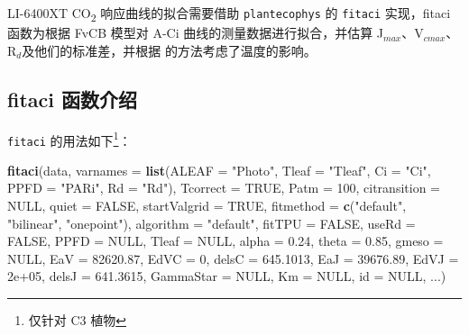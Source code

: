 \documentclass[
]{krantz}
\makeatletter
\newenvironment{Shaded}{\begin{snugshade}}{\end{snugshade}}
\newcommand{\DataTypeTok}[1]{\textcolor[rgb]{0.13,0.29,0.53}{#1}}
\newcommand{\DecValTok}[1]{\textcolor[rgb]{0.00,0.00,0.81}{#1}}
\newcommand{\FloatTok}[1]{\textcolor[rgb]{0.00,0.00,0.81}{#1}}
\newcommand{\KeywordTok}[1]{\textcolor[rgb]{0.13,0.29,0.53}{\textbf{#1}}}
\newcommand{\NormalTok}[1]{#1}
\newcommand{\OtherTok}[1]{\textcolor[rgb]{0.56,0.35,0.01}{#1}}
\newcommand{\StringTok}[1]{\textcolor[rgb]{0.31,0.60,0.02}{#1}}
\newenvironment{kframe}{%
\medskip{}
\setlength{\fboxsep}{.8em}
 \def\at@end@of@kframe{}%
 \ifinner\ifhmode%
  \def\at@end@of@kframe{\end{minipage}}%
  \begin{minipage}{\columnwidth}%
 \fi\fi%
 \def\FrameCommand##1{\hskip\@totalleftmargin \hskip-\fboxsep
 \colorbox{shadecolor}{##1}\hskip-\fboxsep
     \hskip-\linewidth \hskip-\@totalleftmargin \hskip\columnwidth}%
 \MakeFramed {\advance\hsize-\width
   \@totalleftmargin\z@ \linewidth\hsize
   \@setminipage}}%
 {\par\unskip\endMakeFramed%
 \at@end@of@kframe}
\renewenvironment{Shaded}{\begin{kframe}}{\end{kframe}}
\makeatother
\begin{document}
LI-6400XT CO\textsubscript{2} 响应曲线的拟合需要借助 \texttt{plantecophys} 的 \texttt{fitaci} 实现，fitaci 函数为根据 FvCB 模型对 A-Ci 曲线的测量数据进行拟合，并估算 J\(_{max}\)、V\(_{cmax}\)、R\(_{d}\)及他们的标准差，并根据
\citet{Medlyn2002Temperature} 的方法考虑了温度的影响。

\hypertarget{fitaci_intro}{%
\subsection{fitaci 函数介绍}\label{fitaci_intro}}

\texttt{fitaci} 的用法如下\footnote{仅针对 C3 植物}：

\begin{Shaded}
\begin{Highlighting}[]
\KeywordTok{fitaci}\NormalTok{(data, }\DataTypeTok{varnames =} \KeywordTok{list}\NormalTok{(}\DataTypeTok{ALEAF =} \StringTok{"Photo"}\NormalTok{, }
  \DataTypeTok{Tleaf =} \StringTok{"Tleaf"}\NormalTok{, }\DataTypeTok{Ci =} \StringTok{"Ci"}\NormalTok{, }\DataTypeTok{PPFD =} \StringTok{"PARi"}\NormalTok{, }
  \DataTypeTok{Rd =} \StringTok{"Rd"}\NormalTok{), }\DataTypeTok{Tcorrect =} \OtherTok{TRUE}\NormalTok{, }\DataTypeTok{Patm =} \DecValTok{100}\NormalTok{, }
  \DataTypeTok{citransition =} \OtherTok{NULL}\NormalTok{, }\DataTypeTok{quiet =} \OtherTok{FALSE}\NormalTok{, }
  \DataTypeTok{startValgrid =} \OtherTok{TRUE}\NormalTok{, }\DataTypeTok{fitmethod =} 
  \KeywordTok{c}\NormalTok{(}\StringTok{"default"}\NormalTok{, }\StringTok{"bilinear"}\NormalTok{, }\StringTok{"onepoint"}\NormalTok{), }
  \DataTypeTok{algorithm =} \StringTok{"default"}\NormalTok{, }\DataTypeTok{fitTPU =} \OtherTok{FALSE}\NormalTok{, }
  \DataTypeTok{useRd =} \OtherTok{FALSE}\NormalTok{, }\DataTypeTok{PPFD =} \OtherTok{NULL}\NormalTok{, }\DataTypeTok{Tleaf =} \OtherTok{NULL}\NormalTok{, }
  \DataTypeTok{alpha =} \FloatTok{0.24}\NormalTok{, }\DataTypeTok{theta =} \FloatTok{0.85}\NormalTok{, }\DataTypeTok{gmeso =} \OtherTok{NULL}\NormalTok{, }
  \DataTypeTok{EaV =} \FloatTok{82620.87}\NormalTok{, }\DataTypeTok{EdVC =} \DecValTok{0}\NormalTok{, }\DataTypeTok{delsC =} \FloatTok{645.1013}\NormalTok{,}
  \DataTypeTok{EaJ =} \FloatTok{39676.89}\NormalTok{, }\DataTypeTok{EdVJ =} \FloatTok{2e+05}\NormalTok{, }
  \DataTypeTok{delsJ =} \FloatTok{641.3615}\NormalTok{, }\DataTypeTok{GammaStar =} \OtherTok{NULL}\NormalTok{, }
  \DataTypeTok{Km =} \OtherTok{NULL}\NormalTok{, }\DataTypeTok{id =} \OtherTok{NULL}\NormalTok{, ...)}


\end{Highlighting}
\end{Shaded}
\end{document}
